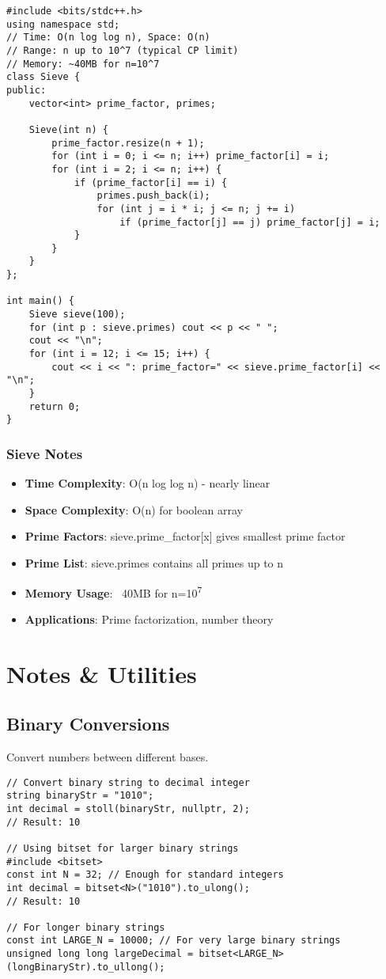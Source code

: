 \documentclass[11pt,a4paper]{article}
\begin{document}
\begin{lstlisting}[caption={Sieve of Eratosthenes}]
#include <bits/stdc++.h>
using namespace std;
// Time: O(n log log n), Space: O(n)
// Range: n up to 10^7 (typical CP limit)
// Memory: ~40MB for n=10^7
class Sieve {
public:
    vector<int> prime_factor, primes;
    
    Sieve(int n) {
        prime_factor.resize(n + 1);
        for (int i = 0; i <= n; i++) prime_factor[i] = i;
        for (int i = 2; i <= n; i++) {
            if (prime_factor[i] == i) {
                primes.push_back(i);
                for (int j = i * i; j <= n; j += i)
                    if (prime_factor[j] == j) prime_factor[j] = i;
            }
        }
    }
};

int main() {
    Sieve sieve(100);
    for (int p : sieve.primes) cout << p << " ";
    cout << "\n";
    for (int i = 12; i <= 15; i++) {
        cout << i << ": prime_factor=" << sieve.prime_factor[i] << "\n";
    }  
    return 0;
}
\end{lstlisting}

\subsubsection{Sieve Notes}
\begin{itemize}
\item \textbf{Time Complexity}: O(n log log n) - nearly linear
\item \textbf{Space Complexity}: O(n) for boolean array
\item \textbf{Prime Factors}: sieve.prime\_factor[x] gives smallest prime factor
\item \textbf{Prime List}: sieve.primes contains all primes up to n
\item \textbf{Memory Usage}: ~40MB for n=10\textsuperscript{7}
\item \textbf{Applications}: Prime factorization, number theory
\end{itemize}

\newpage
\section{Notes \& Utilities}

\subsection{Binary Conversions}
Convert numbers between different bases.

\begin{lstlisting}[caption={Binary to Decimal Conversion}]
// Convert binary string to decimal integer
string binaryStr = "1010";
int decimal = stoll(binaryStr, nullptr, 2);
// Result: 10

// Using bitset for larger binary strings
#include <bitset>
const int N = 32; // Enough for standard integers
int decimal = bitset<N>("1010").to_ulong();
// Result: 10

// For longer binary strings
const int LARGE_N = 10000; // For very large binary strings
unsigned long long largeDecimal = bitset<LARGE_N>(longBinaryStr).to_ullong();
\end{lstlisting}
\end{document}

